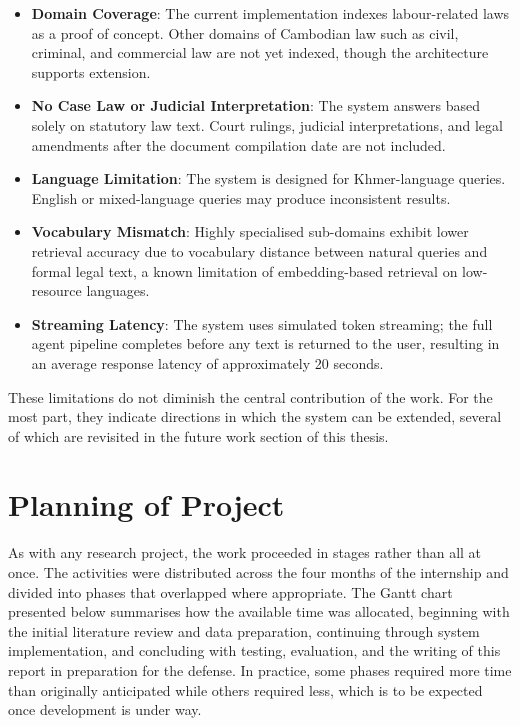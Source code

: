 \begin{itemize}
    \item \textbf{Domain Coverage}: The current implementation indexes labour-related
    laws as a proof of concept. Other domains of Cambodian law such as civil, criminal,
    and commercial law are not yet indexed, though the architecture supports extension.

    \item \textbf{No Case Law or Judicial Interpretation}: The system answers based
    solely on statutory law text. Court rulings, judicial interpretations, and legal
    amendments after the document compilation date are not included.

    \item \textbf{Language Limitation}: The system is designed for Khmer-language
    queries. English or mixed-language queries may produce inconsistent results.

    \item \textbf{Vocabulary Mismatch}: Highly specialised sub-domains exhibit lower
    retrieval accuracy due to vocabulary distance between natural queries and formal
    legal text, a known limitation of embedding-based retrieval on low-resource
    languages.

    \item \textbf{Streaming Latency}: The system uses simulated token streaming; the
    full agent pipeline completes before any text is returned to the user, resulting
    in an average response latency of approximately 20 seconds.
\end{itemize}

\hs These limitations do not diminish the central contribution of the work. For the most
part, they indicate directions in which the system can be extended, several of which are
revisited in the future work section of this thesis.

\section{Planning of Project}

\hs As with any research project, the work proceeded in stages rather than all at once.
The activities were distributed across the four months of the internship and divided
into phases that overlapped where appropriate. The Gantt chart presented below
summarises how the available time was allocated, beginning with the initial literature
review and data preparation, continuing through system implementation, and concluding
with testing, evaluation, and the writing of this report in preparation for the defense.
In practice, some phases required more time than originally anticipated while others
required less, which is to be expected once development is under way.

